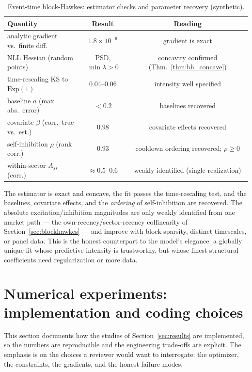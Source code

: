 \documentclass[11pt]{article}
\theoremstyle{plain}
\theoremstyle{definition}
\theoremstyle{remark}
\begin{document}
\begin{table}[h]
\centering
\caption{Event-time block-Hawkes: estimator checks and parameter recovery (synthetic).}
\label{tab:blockhawkes}
\begin{tabular}{@{}lcc@{}}
\toprule
Quantity & Result & Reading \\
\midrule
analytic gradient vs.\ finite diff. & $1.8\times10^{-6}$ & gradient is exact \\
NLL Hessian (random points) & PSD, $\min\lambda>0$ & concavity confirmed (Thm.~\ref{thm:bh_concave}) \\
time-rescaling KS to $\mathrm{Exp}(1)$ & $0.04$--$0.06$ & intensity well specified \\
baseline $a$ (max abs.\ error) & $<0.2$ & baselines recovered \\
covariate $\beta$ (corr.\ true vs.\ est.) & $0.98$ & covariate effects recovered \\
self-inhibition $\rho$ (rank corr.) & $0.93$ & cooldown ordering recovered; $\rho\ge0$ \\
within-sector $A_{ss}$ (corr.) & $\approx0.5$--$0.6$ & weakly identified (single realization) \\
\bottomrule
\end{tabular}
\end{table}

The estimator is exact and concave, the fit passes the time-rescaling test, and the baselines, covariate effects, and the \emph{ordering} of self-inhibition are recovered. The absolute excitation/inhibition magnitudes are only weakly identified from one market path --- the own-recency/sector-recency collinearity of Section~\ref{sec:blockhawkes} --- and improve with block sparsity, distinct timescales, or panel data. This is the honest counterpart to the model's elegance: a globally unique fit whose predictive intensity is trustworthy, but whose finest structural coefficients need regularization or more data.

\section{Numerical experiments: implementation and coding choices}
\label{sec:coding}

This section documents how the studies of Section~\ref{sec:results} are implemented, so the numbers are reproducible and the engineering trade-offs are explicit. The emphasis is on the choices a reviewer would want to interrogate: the optimizer, the constraints, the gradients, and the honest failure modes.
\end{document}
